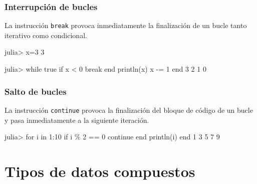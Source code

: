 \documentclass[
  letterpaper,
  DIV=11,
  numbers=noendperiod]{scrreprt}
\newenvironment{Shaded}{\begin{snugshade}}{\end{snugshade}}
\newcommand{\ConstantTok}[1]{\textcolor[rgb]{0.56,0.35,0.01}{#1}}
\newcommand{\ControlFlowTok}[1]{\textcolor[rgb]{0.00,0.23,0.31}{#1}}
\newcommand{\FloatTok}[1]{\textcolor[rgb]{0.68,0.00,0.00}{#1}}
\newcommand{\FunctionTok}[1]{\textcolor[rgb]{0.28,0.35,0.67}{#1}}
\newcommand{\KeywordTok}[1]{\textcolor[rgb]{0.00,0.23,0.31}{#1}}
\newcommand{\NormalTok}[1]{\textcolor[rgb]{0.00,0.23,0.31}{#1}}
\newcommand{\OperatorTok}[1]{\textcolor[rgb]{0.37,0.37,0.37}{#1}}
\begin{document}
\hypertarget{interrupciuxf3n-de-bucles}{%
\subsection{Interrupción de bucles}\label{interrupciuxf3n-de-bucles}}

La instrucción \texttt{break} provoca inmediatamente la finalización de
un bucle tanto iterativo como condicional.

\begin{Shaded}
\begin{Highlighting}[]
\NormalTok{julia}\OperatorTok{\textgreater{}}\NormalTok{ x}\OperatorTok{=}\FloatTok{3}
\FloatTok{3}

\NormalTok{julia}\OperatorTok{\textgreater{}} \ControlFlowTok{while} \ConstantTok{true}
          \ControlFlowTok{if}\NormalTok{ x }\OperatorTok{\textless{}} \FloatTok{0} 
             \ControlFlowTok{break}
          \ControlFlowTok{end}
          \FunctionTok{println}\NormalTok{(x)}
\NormalTok{          x }\OperatorTok{{-}=} \FloatTok{1}
       \ControlFlowTok{end}
\FloatTok{3}
\FloatTok{2}
\FloatTok{1}
\FloatTok{0}
\end{Highlighting}
\end{Shaded}

\hypertarget{salto-de-bucles}{%
\subsection{Salto de bucles}\label{salto-de-bucles}}

La instrucción \texttt{continue} provoca la finalización del bloque de
código de un bucle y pasa inmediatamente a la siguiente iteración.

\begin{Shaded}
\begin{Highlighting}[]
\NormalTok{julia}\OperatorTok{\textgreater{}} \ControlFlowTok{for}\NormalTok{ i }\KeywordTok{in} \FloatTok{1}\OperatorTok{:}\FloatTok{10}
          \ControlFlowTok{if}\NormalTok{ i }\OperatorTok{\%} \FloatTok{2} \OperatorTok{==} \FloatTok{0}
             \ControlFlowTok{continue}
          \ControlFlowTok{end}
          \FunctionTok{println}\NormalTok{(i)}
       \ControlFlowTok{end}
\FloatTok{1}
\FloatTok{3}
\FloatTok{5}
\FloatTok{7}
\FloatTok{9}
\end{Highlighting}
\end{Shaded}


\hypertarget{tipos-de-datos-compuestos}{%
\chapter{Tipos de datos compuestos}\label{tipos-de-datos-compuestos}}
\end{document}
